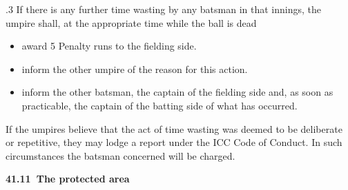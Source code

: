 \documentclass[12pt]{article}
\begin{document}
\vspace{\baselineskip}
\begin{adjustwidth}{0.5in}{0.12in}
{\fontsize{9pt}{10.8pt}.3 If there is any further time wasting by any batsman in that innings, the umpire shall, at the appropriate time while the ball is dead\par}\par

\end{adjustwidth}


\vspace{\baselineskip}
\begin{itemize}
	\item {\fontsize{9pt}{10.8pt}\selectfont award 5 Penalty runs to the fielding side.\par}\par


\vspace{\baselineskip}
	\item {\fontsize{9pt}{10.8pt}\selectfont inform the other umpire of the reason for this action.\par}\par


\vspace{\baselineskip}
	\item {\fontsize{9pt}{10.8pt}\selectfont inform the other batsman, the captain of the fielding side and, as soon as practicable, the captain of the batting side of what has occurred.\par}
\end{itemize}\par


\vspace{\baselineskip}
\begin{adjustwidth}{0.5in}{0.06in}
{\fontsize{8pt}{9.6pt}\selectfont If the umpires believe that the act of time wasting was deemed to be deliberate or repetitive, they may lodge a report under the ICC Code of Conduct. In such circumstances the batsman concerned will be charged.\par}\par

\end{adjustwidth}


\vspace{\baselineskip}
{\fontsize{11pt}{13.2pt}\selectfont \textbf{41.11\  The protected area}\par}\par
\end{document}
